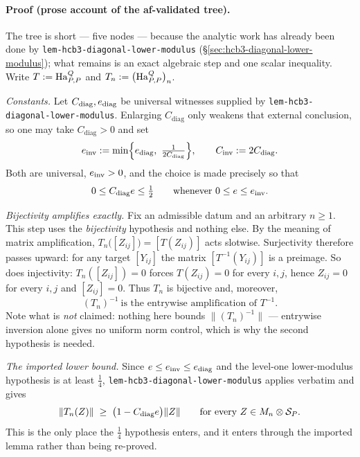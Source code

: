 \paragraph{Proof (prose account of the af-validated tree).}
The tree is short --- five nodes --- because the analytic work has already been done by
\texttt{lem-hcb3-diagonal-lower-modulus} (\S\ref{sec:hcb3-diagonal-lower-modulus}); what
remains is an exact algebraic step and one scalar inequality. Write $T:=\mathrm{Ha}^{Q}_{P,P}$ and
$T_n:=\bigl(\mathrm{Ha}^{Q}_{P,P}\bigr)_{n}$.

\emph{Constants.} Let $C_{\mathrm{diag}},e_{\mathrm{diag}}$ be universal witnesses
supplied by \texttt{lem-hcb3-diagonal-lower-modulus}. Enlarging $C_{\mathrm{diag}}$ only
weakens that external conclusion, so one may take $C_{\mathrm{diag}}>0$ and set
\[
  \comb_{\mathrm{inv}}:=\min\Bigl\{\comb_{\mathrm{diag}},\ \tfrac1{2C_{\mathrm{diag}}}\Bigr\},
  \qquad
  C_{\mathrm{inv}}:=2C_{\mathrm{diag}} .
\]
Both are universal, $e_{\mathrm{inv}}>0$, and the choice is made precisely so that
\begin{equation}\label{eq:di-half}
  0\le C_{\mathrm{diag}}e\le\tfrac12
  \qquad\text{whenever }0\le e\le e_{\mathrm{inv}} .
\end{equation}

\emph{Bijectivity amplifies exactly.} Fix an admissible datum and an arbitrary $n\ge1$.
This step uses the \emph{bijectivity} hypothesis and nothing else.
By the meaning of matrix amplification, $T_n\bigl([Z_{ij}]\bigr)=[T(Z_{ij})]$ acts
slotwise. Surjectivity therefore passes upward: for any target $[Y_{ij}]$ the matrix
$[T^{-1}(Y_{ij})]$ is a preimage. So does injectivity: $T_n([Z_{ij}])=0$ forces
$T(Z_{ij})=0$ for every $i,j$, hence $Z_{ij}=0$ for every $i,j$ and $[Z_{ij}]=0$. Thus
$T_n$ is bijective and, moreover,
\begin{equation}\label{eq:di-entrywise}
  (T_n)^{-1}\ \text{is the entrywise amplification of }T^{-1} .
\end{equation}
Note what is \emph{not} claimed: nothing here bounds $\lVert(T_n)^{-1}\rVert$ ---
entrywise inversion alone gives no uniform norm control, which is why the second
hypothesis is needed.

\emph{The imported lower bound.} Since $e\le e_{\mathrm{inv}}\le e_{\mathrm{diag}}$
and the level-one lower-modulus hypothesis is at least $\tfrac14$,
\texttt{lem-hcb3-diagonal-lower-modulus} applies verbatim and gives
\begin{equation}\label{eq:di-lower}
  \lVert T_n(Z)\rVert\;\ge\;\bigl(1-C_{\mathrm{diag}}e\bigr)\lVert Z\rVert
  \qquad\text{for every }Z\in M_{n}\otimes \mathcal S_{P} .
\end{equation}
This is the only place the $\tfrac14$ hypothesis enters, and it enters through the
imported lemma rather than being re-proved.

